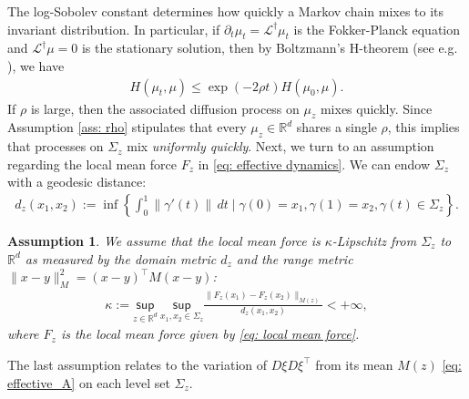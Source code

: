 \documentclass[reqno, 12pt]{article}
\newtheorem{assumption}{Assumption}
\begin{document}
The log-Sobolev constant determines how quickly a Markov chain mixes to its invariant distribution. In particular, if $\partial_{t}\mu_t = \mathcal{L}^{\dagger}\mu_t$ is the Fokker-Planck equation and $\mathcal{L}^{\dagger}\mu = 0$ is the stationary solution, then by Boltzmann's H-theorem (see e.g. \cite[Lemma 2]{vempala2019rapid}), we have 
\begin{align}
    H(\mu_t, \mu) \leq \exp(-2\rho t)H(\mu_0, \mu). \label{eq: boltzmann h-theorem}
\end{align}
If $\rho$ is large, then the associated diffusion process on $\mu_z$ mixes quickly. Since Assumption \eqref{ass: rho} stipulates that every $\mu_z \in \mathbb{R}^d$ shares a single $\rho$, this implies that processes on $\Sigma_z$ mix \emph{uniformly quickly}. Next, we turn to an assumption regarding the local mean force $F_z$ in \eqref{eq: effective dynamics}. We can endow $\Sigma_z$ with a geodesic distance: 
\begin{align}
    d_{z}(x_1, x_2) := \inf\left\{\int_{0}^{1}\|\gamma'(t)\|\,dt \mid \gamma(0) = x_1, \gamma(1) = x_2, \gamma(t) \in \Sigma_{z}\right\}.
\end{align}

\begin{assumption}
\label{ass: kappa}
    We assume that the local mean force is $\kappa$-Lipschitz from $\Sigma_z$ to $\mathbb{R}^d$ as measured by the domain metric $d_z$ and the range metric $\|x-y\|_{M}^2 = (x-y)^{\top}M(x-y)$: 
    \begin{align}
        \kappa := \underset{z \in \mathbb{R}^d}{\textsf{sup}}\:\underset{x_1,x_2 \in \Sigma_z}{\textsf{sup}}\frac{\|F_z(x_1) - F_z(x_2)\|_{M(z)}}{d_{z}(x_1, x_2)} < +\infty, \label{eq: kappa}
    \end{align}
    where $F_z$ is the local mean force given by \eqref{eq: local mean force}.
\end{assumption}

The last assumption relates to the variation of $D\xi D\xi^{\top}$ from its mean $M(z)$ \eqref{eq: effective_A} on each level set $\Sigma_z$. 
\end{document}
